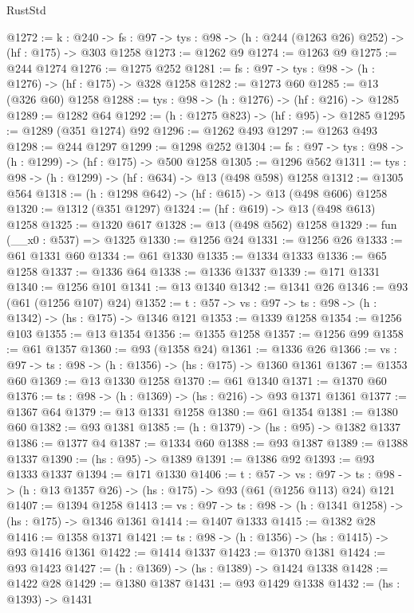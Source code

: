 \begin{lexlean}{RustStd}
\begin{coremodule}
@1272 := {k : @240} ->
  {fs : @97} -> {tys : @98} -> (h : @244 (@1263 @26) @252) -> (hf : @175) -> @303 @1258
@1273 := @1262 @9
@1274 := @1263 @9
@1275 := @244 @1274
@1276 := @1275 @252
@1281 := {fs : @97} -> {tys : @98} -> (h : @1276) -> (hf : @175) -> @328 @1258
@1282 := @1273 @60
@1285 := @13 (@326 @60) @1258
@1288 := {tys : @98} -> (h : @1276) -> (hf : @216) -> @1285
@1289 := @1282 @64
@1292 := (h : @1275 @823) -> (hf : @95) -> @1285
@1295 := @1289 (@351 @1274) @92
@1296 := @1262 @493
@1297 := @1263 @493
@1298 := @244 @1297
@1299 := @1298 @252
@1304 := {fs : @97} -> {tys : @98} -> (h : @1299) -> (hf : @175) -> @500 @1258
@1305 := @1296 @562
@1311 := {tys : @98} -> (h : @1299) -> (hf : @634) -> @13 (@498 @598) @1258
@1312 := @1305 @564
@1318 := (h : @1298 @642) -> (hf : @615) -> @13 (@498 @606) @1258
@1320 := @1312 (@351 @1297)
@1324 := (hf : @619) -> @13 (@498 @613) @1258
@1325 := @1320 @617
@1328 := @13 (@498 @562) @1258
@1329 := fun (__x0 : @537) => @1325
@1330 := @1256 @24
@1331 := @1256 @26
@1333 := @61 @1331 @60
@1334 := @61 @1330
@1335 := @1334 @1333
@1336 := @65 @1258
@1337 := @1336 @64
@1338 := @1336 @1337
@1339 := @171 @1331
@1340 := @1256 @101
@1341 := @13 @1340
@1342 := @1341 @26
@1346 := @93 (@61 (@1256 @107) @24)
@1352 := {t : @57} -> {vs : @97} -> {ts : @98} -> (h : @1342) -> (hs : @175) -> @1346 @121
@1353 := @1339 @1258
@1354 := @1256 @103
@1355 := @13 @1354
@1356 := @1355 @1258
@1357 := @1256 @99
@1358 := @61 @1357
@1360 := @93 (@1358 @24)
@1361 := @1336 @26
@1366 := {vs : @97} -> {ts : @98} -> (h : @1356) -> (hs : @175) -> @1360 @1361
@1367 := @1353 @60
@1369 := @13 @1330 @1258
@1370 := @61 @1340
@1371 := @1370 @60
@1376 := {ts : @98} -> (h : @1369) -> (hs : @216) -> @93 @1371 @1361
@1377 := @1367 @64
@1379 := @13 @1331 @1258
@1380 := @61 @1354
@1381 := @1380 @60
@1382 := @93 @1381
@1385 := (h : @1379) -> (hs : @95) -> @1382 @1337
@1386 := @1377 @4
@1387 := @1334 @60
@1388 := @93 @1387
@1389 := @1388 @1337
@1390 := (hs : @95) -> @1389
@1391 := @1386 @92
@1393 := @93 @1333 @1337
@1394 := @171 @1330
@1406 := {t : @57} ->
  {vs : @97} -> {ts : @98} -> (h : @13 @1357 @26) -> (hs : @175) -> @93 (@61 (@1256 @113) @24) @121
@1407 := @1394 @1258
@1413 := {vs : @97} -> {ts : @98} -> (h : @1341 @1258) -> (hs : @175) -> @1346 @1361
@1414 := @1407 @1333
@1415 := @1382 @28
@1416 := @1358 @1371
@1421 := {ts : @98} -> (h : @1356) -> (hs : @1415) -> @93 @1416 @1361
@1422 := @1414 @1337
@1423 := @1370 @1381
@1424 := @93 @1423
@1427 := (h : @1369) -> (hs : @1389) -> @1424 @1338
@1428 := @1422 @28
@1429 := @1380 @1387
@1431 := @93 @1429 @1338
@1432 := (hs : @1393) -> @1431

\end{coremodule}
\end{lexlean}
